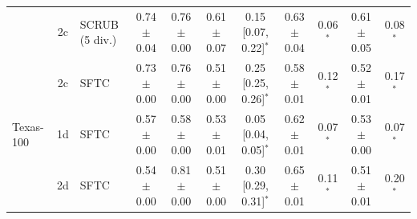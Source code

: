 \begin{table}[t]
{\begin{tabular}{l c l c cc c cc cc}
 & 2c & SCRUB (5 div.) & 0.74 $\pm$ 0.04 & 0.76 $\pm$ 0.00 & 0.61 $\pm$ 0.07 & 0.15 [0.07, 0.22]$^{*}$ & 0.63 $\pm$ 0.04 & 0.06$^{*}$ & 0.61 $\pm$ 0.05 & 0.08$^{*}$ \\
 & 2c & SFTC & 0.73 $\pm$ 0.00 & 0.76 $\pm$ 0.00 & 0.51 $\pm$ 0.00 & 0.25 [0.25, 0.26]$^{*}$ & 0.58 $\pm$ 0.01 & 0.12$^{*}$ & 0.52 $\pm$ 0.01 & 0.17$^{*}$ \\
\midrule
Texas-100 & 1d & SFTC & 0.57 $\pm$ 0.00 & 0.58 $\pm$ 0.00 & 0.53 $\pm$ 0.01 & 0.05 [0.04, 0.05]$^{*}$ & 0.62 $\pm$ 0.01 & 0.07$^{*}$ & 0.53 $\pm$ 0.00 & 0.07$^{*}$ \\
 & 2d & SFTC & 0.54 $\pm$ 0.00 & 0.81 $\pm$ 0.00 & 0.51 $\pm$ 0.00 & 0.30 [0.29, 0.31]$^{*}$ & 0.65 $\pm$ 0.01 & 0.11$^{*}$ & 0.51 $\pm$ 0.01 & 0.20$^{*}$ \\
\bottomrule
\end{tabular}}
\end{table}
